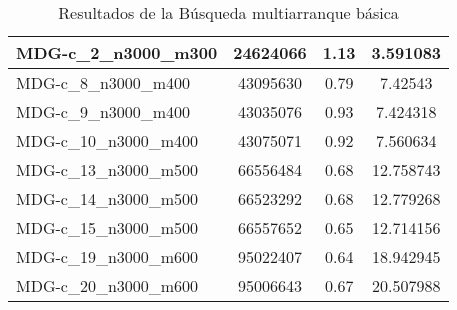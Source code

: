 \documentclass[11pt,a4paper]{article}
\begin{document}
\begin{table}[H]
\begin{center}
\begin{tabular}{|l|c|c|c|}
					MDG-c\_2\_n3000\_m300 & 24624066 & 1.13 & 3.591083 \\ \hline
					MDG-c\_8\_n3000\_m400 & 43095630 & 0.79 & 7.42543 \\ \hline
					MDG-c\_9\_n3000\_m400 & 43035076 & 0.93 & 7.424318 \\ \hline
					MDG-c\_10\_n3000\_m400 & 43075071 & 0.92 & 7.560634 \\ \hline
					MDG-c\_13\_n3000\_m500 & 66556484 & 0.68 & 12.758743 \\ \hline
					MDG-c\_14\_n3000\_m500 & 66523292 & 0.68 & 12.779268 \\ \hline
					MDG-c\_15\_n3000\_m500 & 66557652 & 0.65 & 12.714156 \\ \hline
					MDG-c\_19\_n3000\_m600 & 95022407 & 0.64 & 18.942945 \\ \hline
					MDG-c\_20\_n3000\_m600 & 95006643 & 0.67 & 20.507988 \\ \hline
				\end{tabular}
							\end{center}
				\caption{Resultados de la Búsqueda multiarranque básica}
				\label{}

			\end{table}
		
\end{document}
